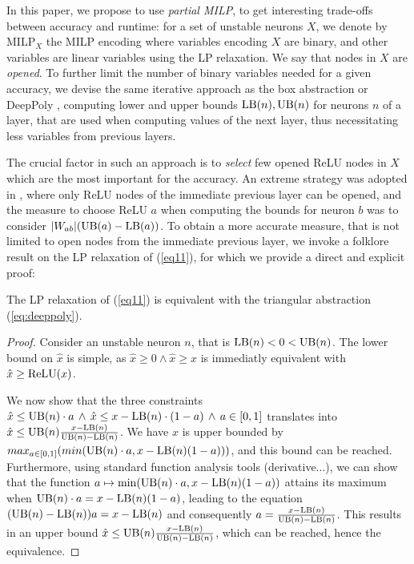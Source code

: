 In this paper, we propose to use {\em partial MILP}, to get interesting trade-offs between accuracy and runtime: 
for a set of unstable neurons $X$, we denote by MILP$_X$ the MILP encoding where variables encoding $X$ are binary, and other variables are linear variables using the LP relaxation. We say that nodes in $X$ are {\em opened}. 
To further limit the number of binary variables needed for a given accuracy, we devise the same iterative approach as the box abstraction or DeepPoly \cite{deeppoly}, computing lower 
and upper bounds $\mathrm{LB}(n),\mathrm{UB}(n)$ for neurons $n$ of a layer, that are used when computing values of the next layer, thus necessitating less variables from previous layers. 

The crucial factor in such an approach is to {\em select} few opened ReLU nodes in $X$ which are the most important for the accuracy. An extreme strategy was adopted in \cite{DivideAndSlide}, where only ReLU nodes of the immediate previous layer can be opened, and the measure to choose ReLU $a$ when computing the bounds for neuron $b$ was to consider $|W_{ab}| (\mathrm{UB}(a)-\mathrm{LB}(a))$. 
To obtain a more accurate measure, that 
is not limited to open nodes from the immediate previous layer, 
{\color{blue} we invoke a folklore result on the LP relaxation of (\ref{eq11}), for which we provide a direct and explicit proof:}



\begin{proposition}
	\label{LP}
	{\color{blue} The LP relaxation of (\ref{eq11}) is equivalent with the triangular abstraction 	(\ref{eq:deeppoly}).}
\end{proposition}
 


\begin{proof}
	Consider an unstable neuron $n$, that is $\mathrm{LB}(n) < 0 < \mathrm{UB}(n)$.
The lower bound on $\hat{x}$ is simple, as $\hat{x} \geq 0 \wedge \hat{x} \geq x$ is immediatly equivalent with $\hat{x} \geq \mathrm{ReLU}(x)$.

We now show that the three constraints 
$\hat{x} \leq \mathrm{UB}(n) \cdot a \, \wedge \, \hat{x} \leq x-\mathrm{LB}(n) \cdot (1-a) \, \wedge \, a \in [0,1]$ translates into $\hat{x} \leq \mathrm{UB}(n) \frac{x-\mathrm{LB}(n)}{\mathrm{UB}(n)-\mathrm{LB}(n)}$. 
We have $\hat{x}$ is upper bounded by $max_{a \in [0,1]} (min(\mathrm{UB}(n) \cdot a, x - \mathrm{LB}(n) (1-a)))$, and this bound can be reached. Furthermore, using standard function analysis tools (derivative...), we can show that the function $a \mapsto \min(\mathrm{UB}(n) \cdot a, x - \mathrm{LB}(n) (1-a))$ attains its maximum when $\mathrm{UB}(n) \cdot a = x - \mathrm{LB}(n) (1-a)$, leading to the equation $(\mathrm{UB}(n) - \mathrm{LB}(n)) a = x - \mathrm{LB}(n)$ and consequently $a = \frac{x - \mathrm{LB}(n)}{\mathrm{UB}(n)-\mathrm{LB}(n)}$. This results in an upper bound $\hat{x} \leq \mathrm{UB}(n) \frac{x - \mathrm{LB}(n)}{\mathrm{UB}(n)-\mathrm{LB}(n)}$, which can be reached, hence the equivalence.
\end{proof}